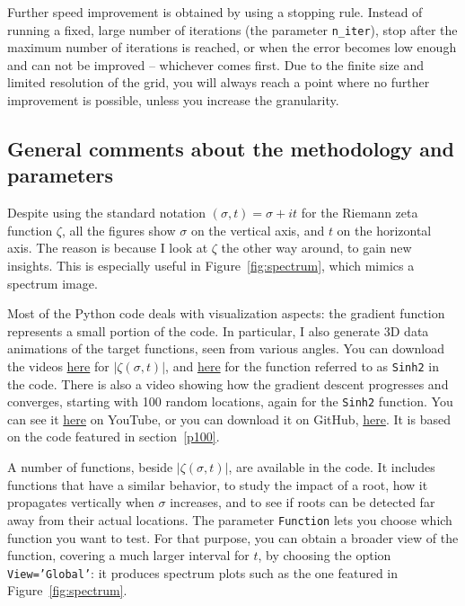 \documentclass[oneside,10pt]{book}
\begin{document}
Further speed improvement is obtained by using a stopping rule. Instead of running a fixed, large number of iterations (the parameter \texttt{n\_iter}), stop after the maximum number of iterations is reached, or when the error becomes low enough and can not be improved -- whichever comes first. Due to the finite size and limited resolution of the grid, you will always reach a point where no further improvement is possible, unless you increase the granularity.










\subsection{General comments about the methodology and parameters}\label{ppzsdxvb}

Despite using the standard notation $(\sigma, t)=\sigma +it$ for the Riemann zeta function $\zeta$, all the figures show $\sigma$ on the vertical axis, and $t$ on the horizontal axis. The reason is because I look at $\zeta$ the other way around, to gain new insights. This is especially
 useful in Figure~\ref{fig:spectrum}, which mimics a spectrum image.

Most of the Python code deals with visualization aspects: the gradient function represents a small portion of the code. In particular, I also generate 3D data animations of the target functions, seen from various angles. You can download the videos
\href{https://github.com/VincentGranville/Experimental-Math-Number-Theory/blob/main/Images/gradient_3D_rotate_zeta.mp4}{here} for $|\zeta(\sigma,t)|$, and \href{https://github.com/VincentGranville/Experimental-Math-Number-Theory/blob/main/Images/gradient_3D_Rotate.mp4}{here} for the function referred to as \texttt{Sinh2} in the code. There is also a video showing how the gradient descent progresses and converges,
 starting with 100 random locations, again for the \texttt{Sinh2} function. You can see it \href{https://www.youtube.com/watch?v=pqQsLpPkvbw}{here} on YouTube, or you can download it on GitHub, \href{https://github.com/VincentGranville/Experimental-Math-Number-Theory/blob/main/Images/RH4_ortho.mp4}{here}. It is based on the code featured in section~\ref{p100}.

A number of functions, beside $|\zeta(\sigma, t)|$, are available in the code. It includes functions that have a similar behavior, to study the impact of a root, how it propagates vertically when $\sigma$ increases, and to see if roots can be detected far away from their actual locations. The parameter
 \texttt{Function} lets you choose which function you want to test. For that purpose, you can obtain a broader view of the function, covering a much larger interval for $t$, by choosing the option \texttt{View='Global'}: it produces spectrum plots such as the one featured in
 Figure~\ref{fig:spectrum}.
\end{document}
